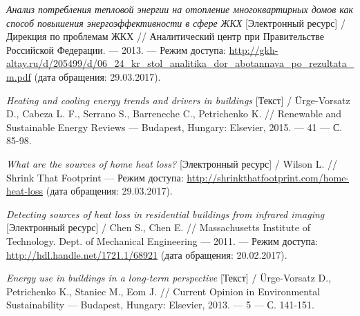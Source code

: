 \begin{thebibliography}{00}
	\emph{Анализ потребления тепловой энергии на отопление многоквартирных домов как способ повышения энергоэффективности в сфере ЖКХ} [Электронный ресурс] / Дирекция по проблемам ЖКХ //
	Аналитический центр при Правительстве Российской Федерации. --- 2013. --- Режим доступа:
	\url{http://gkh-altay.ru/d/205499/d/06_24_kr_stol_analitika_dor_abotannaya_po_rezultata_m.pdf} (дата обращения: 29.03.2017).

	\emph{Heating and cooling energy trends and drivers in buildings} [Текст] / Ürge-Vorsatz D., Cabeza L. F., Serrano S., Barreneche C., Petrichenko K. //
	Renewable and Sustainable Energy Reviews --- Budapest, Hungary: Elsevier, 2015. --- \No{} 41 --- С. 85-98.

	\emph{What are the sources of home heat loss?} [Электронный ресурс] / Wilson L. //
	Shrink That Footprint --- Режим доступа: \url{http://shrinkthatfootprint.com/home-heat-loss} (дата обращения: 29.03.2017).

	\emph{Detecting sources of heat loss in residential buildings from infrared imaging} [Электронный ресурс] / Chen S., Chen E. //
	Massachusetts Institute of Technology. Dept. of Mechanical Engineering --- 2011. --- Режим доступа: \url{http://hdl.handle.net/1721.1/68921} (дата обращения: 20.02.2017).

	\emph{Energy use in buildings in a long-term perspective} [Текст] / Ürge-Vorsatz D., Petrichenko K., Staniec M., Eom J. //
	Current Opinion in Environmental Sustainability --- Budapest, Hungary: Elsevier, 2013. --- \No{} 5 --- С. 141-151.
\end{thebibliography}